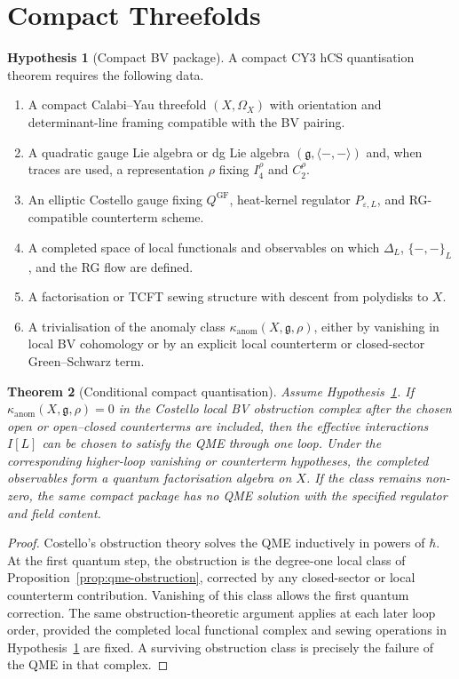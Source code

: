 \documentclass[11pt]{amsart}
\providecommand{\gfrak}{\mathfrak{g}}
\providecommand{\kanom}{\kappa_{\mathrm{anom}}}
\theoremstyle{plain}
\newtheorem{theorem}{Theorem}[section]
\theoremstyle{definition}
\newtheorem{hypothesis}[theorem]{Hypothesis}
\theoremstyle{remark}
\begin{document}
\section{Compact Threefolds}
\label{sec:compact-threefolds}

\begin{hypothesis}[Compact BV package]
\label{hyp:compact-package}
A compact CY3 hCS quantisation theorem requires the following data.
\begin{enumerate}
\item A compact Calabi--Yau threefold $(X,\Omega_X)$ with orientation and
determinant-line framing compatible with the BV pairing.
\item A quadratic gauge Lie algebra or dg Lie algebra
$(\gfrak,\langle-,-\rangle)$ and, when traces are used, a representation
$\rho$ fixing $I_4^\rho$ and $C_2^\rho$.
\item An elliptic Costello gauge fixing $Q^{\mathrm{GF}}$, heat-kernel
regulator $P_{\varepsilon,L}$, and RG-compatible counterterm scheme.
\item A completed space of local functionals and observables on which
$\Delta_L$, $\{-,-\}_L$, and the RG flow are defined.
\item A factorisation or TCFT sewing structure with descent from
polydisks to $X$.
\item A trivialisation of the anomaly class
$\kanom(X,\gfrak,\rho)$, either by vanishing in local BV cohomology or
by an explicit local counterterm or closed-sector Green--Schwarz term.
\end{enumerate}
\end{hypothesis}

\begin{theorem}[Conditional compact quantisation]
\label{thm:conditional-compact}
Assume Hypothesis~\ref{hyp:compact-package}. If
$\kanom(X,\gfrak,\rho)=0$ in the Costello local BV obstruction complex
after the chosen open or open--closed counterterms are included, then
the effective interactions $I[L]$ can be chosen to satisfy the QME
through one loop. Under the corresponding higher-loop vanishing or
counterterm hypotheses, the completed observables form a quantum
factorisation algebra on $X$. If the class remains non-zero, the same
compact package has no QME solution with the specified regulator and
field content.
\end{theorem}

\begin{proof}
Costello's obstruction theory solves the QME inductively in powers of
$\hbar$. At the first quantum step, the obstruction is the degree-one
local class of Proposition~\ref{prop:qme-obstruction}, corrected by any
closed-sector or local counterterm contribution. Vanishing of this class
allows the first quantum correction. The same obstruction-theoretic
argument applies at each later loop order, provided the completed local
functional complex and sewing operations in
Hypothesis~\ref{hyp:compact-package} are fixed. A surviving obstruction
class is precisely the failure of the QME in that complex.
\end{proof}
\end{document}
